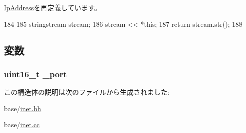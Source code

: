 \hyperlink{structNet_1_1IpAddress_a14a0e4fdb44bd7be64a3c6e5d94f8f0e}{IpAddress}を再定義しています。


\begin{DoxyCode}
184 {
185     stringstream stream;
186     stream << *this;
187     return stream.str();
188 }
\end{DoxyCode}


\subsection{変数}
\hypertarget{structNet_1_1IpWithPort_a88bd61cbe4cfff3dd0b207683764b309}{
\subsubsection[{\_\-port}]{\setlength{\rightskip}{0pt plus 5cm}uint16\_\-t {\bf \_\-port}}}
\label{structNet_1_1IpWithPort_a88bd61cbe4cfff3dd0b207683764b309}


この構造体の説明は次のファイルから生成されました:\begin{DoxyCompactItemize}
\item 
base/\hyperlink{inet_8hh}{inet.hh}\item 
base/\hyperlink{inet_8cc}{inet.cc}\end{DoxyCompactItemize}
